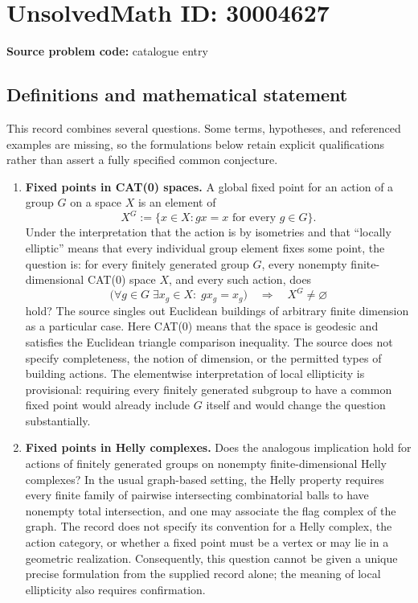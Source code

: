 \documentclass[11pt]{article}
\begin{document}
\section*{UnsolvedMath ID: 30004627}
\textbf{Source problem code:} catalogue entry
\subsection{Definitions and mathematical statement}
This record combines several questions. Some terms, hypotheses, and referenced examples are missing, so the formulations below retain explicit qualifications rather than assert a fully specified common conjecture.

\begin{enumerate}
\item \textbf{Fixed points in CAT(0) spaces.} A global fixed point for an action of a group \(G\) on a space \(X\) is an element of
\[
X^G:=\{x\in X: gx=x\text{ for every }g\in G\}.
\]
Under the interpretation that the action is by isometries and that ``locally elliptic'' means that every individual group element fixes some point, the question is: for every finitely generated group \(G\), every nonempty finite-dimensional CAT(0) space \(X\), and every such action, does
\[
\bigl(\forall g\in G\;\exists x_g\in X:\;gx_g=x_g\bigr)
\quad\Longrightarrow\quad X^G\ne\varnothing
\]
hold? The source singles out Euclidean buildings of arbitrary finite dimension as a particular case. Here CAT(0) means that the space is geodesic and satisfies the Euclidean triangle comparison inequality. The source does not specify completeness, the notion of dimension, or the permitted types of building actions. The elementwise interpretation of local ellipticity is provisional: requiring every finitely generated subgroup to have a common fixed point would already include \(G\) itself and would change the question substantially.

\item \textbf{Fixed points in Helly complexes.} Does the analogous implication hold for actions of finitely generated groups on nonempty finite-dimensional Helly complexes? In the usual graph-based setting, the Helly property requires every finite family of pairwise intersecting combinatorial balls to have nonempty total intersection, and one may associate the flag complex of the graph. The record does not specify its convention for a Helly complex, the action category, or whether a fixed point must be a vertex or may lie in a geometric realization. Consequently, this question cannot be given a unique precise formulation from the supplied record alone; the meaning of local ellipticity also requires confirmation.


\end{enumerate}
\end{document}
